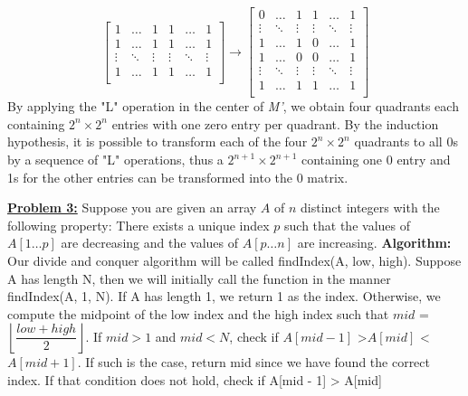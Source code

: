 \documentclass[11pt]{article}
\begin{document}
\begin{flushleft}
\[\begin{bmatrix}
			1      & \dots  & 1      & 1	  & \dots  & 1      \\     
			1      & \dots  & 1      & 1      & \dots  & 1      \\
			\vdots & \ddots & \vdots & \vdots & \ddots & \vdots \\
			1      & \dots  & 1      & 1      & \dots  & 1      \\   
		\end{bmatrix}
		\rightarrow
		\begin{bmatrix}
			0      & \dots  & 1      & 1      & \dots  & 1      \\
			\vdots & \ddots & \vdots & \vdots & \ddots & \vdots \\
			1      & \dots  & 1      & 0 	  & \dots  & 1      \\     
			1      & \dots  & 0      & 0      & \dots  & 1      \\
			\vdots & \ddots & \vdots & \vdots & \ddots & \vdots \\
			1      & \dots  & 1      & 1      & \dots  & 1      \\   
		\end{bmatrix}
		\]
		By applying the "L" operation in the center of \emph{M'}, we obtain four quadrants each containing $2^n \times 2^n$ entries with one zero entry per quadrant. By the induction hypothesis, it is possible to transform each of the four $2^n \times 2^n$ quadrants to all 0s by a sequence of "L" operations, thus a $2^{n + 1} \times 2^{n + 1}$ containing one 0 entry and 1s for the other entries can be transformed into the 0 matrix. 
		\vspace{0.2cm}
		\item \textbf {\underline{Problem 3:}}  Suppose you are given an array $A$ of $n$ distinct
		integers with the following property:
		There exists a unique index $p$ such that the values of
		$A[1\ldots p]$ are decreasing and the values of $A[p \ldots
		n]$ are increasing.\newline\newline
		\textbf{Algorithm:}
		Our divide and conquer algorithm will be called findIndex(A, low, high). Suppose A has length N, then we will initially call the function in the manner findIndex(A, 1, N). If A has length 1, we return 1 as the index. Otherwise, we compute the midpoint of the low index and the high index such that $mid$ = $\left\lfloor\dfrac{low + high}{2}\right\rfloor$. \newline
		If $mid > 1$ and  $mid < N$, check if $A[mid - 1]$ \textgreater $A[mid]$ \textless $A[mid + 1]$. If such is the case, return mid since we have found the correct index. If that condition does not hold, check if \newline A[mid - 1] \textgreater{ A[mid]} 

\end{flushleft}
\end{document}
